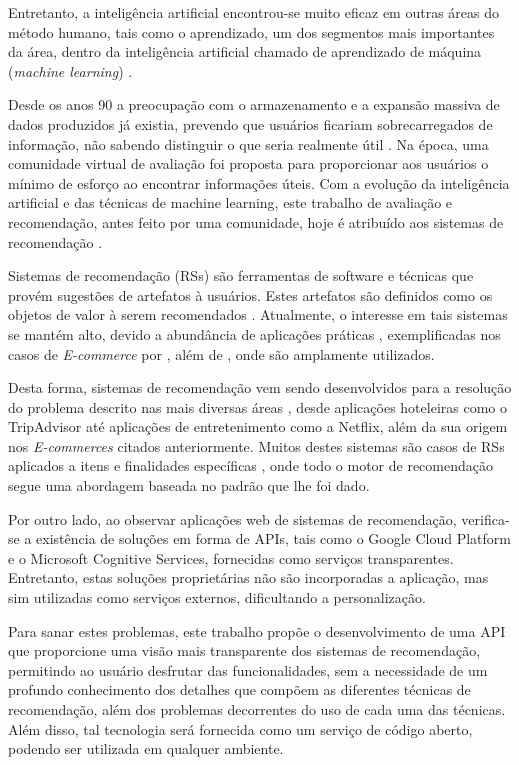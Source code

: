 \documentclass[12pt, openright, oneside, a4paper, brazil]{abntex2}
\begin{document}
Entretanto, a inteligência artificial encontrou-se muito eficaz em outras áreas do método humano, tais como o aprendizado, um dos segmentos mais importantes da área, dentro da inteligência artificial chamado de aprendizado de máquina (\textit{machine learning}) \cite{coppin2015inteligencia}.

Desde os anos 90 a preocupação com o armazenamento e a expansão massiva de dados produzidos já existia, prevendo que usuários ficariam sobrecarregados de informação, não sabendo distinguir o que seria realmente útil \cite{hill1995recommending, adomavicius2005toward}. Na época, uma comunidade virtual de avaliação foi proposta para proporcionar aos usuários o mínimo de esforço ao encontrar informações úteis. Com a evolução da inteligência artificial e das técnicas de machine learning, este trabalho de avaliação e recomendação, antes feito por uma comunidade, hoje é atribuído aos sistemas de recomendação \cite{hill1995recommending}.

Sistemas de recomendação (RSs) são ferramentas de  software e técnicas que provém sugestões de artefatos à usuários. Estes artefatos são definidos como os objetos de valor à serem recomendados \cite{ricci2011introduction}. Atualmente, o interesse em tais sistemas se mantém alto, devido a abundância de aplicações práticas \cite{adomavicius2005toward}, exemplificadas nos casos de \textit{E-commerce} por , além de , onde são amplamente utilizados.

Desta forma, sistemas de recomendação vem sendo desenvolvidos para a resolução do problema descrito nas mais diversas áreas \cite{bennett2007netflix, gavalas2014mobile}, desde aplicações hoteleiras como o TripAdvisor até aplicações de entretenimento como a Netflix, além da sua origem nos \textit{E-commerces} citados anteriormente. Muitos destes sistemas são casos de RSs aplicados a itens e finalidades específicas \cite{huang2002graph, brozovsky2007recommender}, onde todo o motor de recomendação segue uma abordagem baseada no padrão que lhe foi dado.

Por outro lado, ao observar aplicações web de sistemas de recomendação, verifica-se a existência de soluções em forma de APIs, tais como o Google Cloud Platform e o Microsoft Cognitive Services, fornecidas como serviços transparentes. Entretanto, estas soluções proprietárias não são incorporadas a aplicação, mas sim utilizadas como serviços externos, dificultando a personalização.

Para sanar estes problemas, este trabalho propõe o desenvolvimento de uma API que proporcione uma visão mais transparente dos sistemas de recomendação, permitindo ao usuário desfrutar das funcionalidades, sem a necessidade de um profundo conhecimento dos detalhes que compõem as diferentes técnicas de recomendação, além dos problemas decorrentes do uso de cada uma das técnicas. Além disso, tal tecnologia será fornecida como um serviço de código aberto, podendo ser utilizada em qualquer ambiente.
\end{document}
